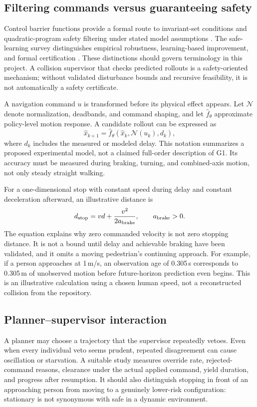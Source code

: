 \documentclass[11pt,a4paper]{article}
\begin{document}
\subsection{Filtering commands versus guaranteeing safety}
Control barrier functions provide a formal route to invariant-set conditions
and quadratic-program safety filtering under stated model assumptions
\citep{cbf}. The safe-learning survey distinguishes empirical robustness,
learning-based improvement, and formal certification \citep{safecontrol}.
These distinctions should govern terminology in this project. A collision
supervisor that checks predicted rollouts is a safety-oriented mechanism;
without validated disturbance bounds and recursive feasibility, it is not
automatically a safety certificate.

A navigation command $u$ is transformed before its physical effect appears.
Let $\mathcal{N}$ denote normalization, deadbands, and command shaping, and
let $\hat f_\theta$ approximate policy-level motion response. A candidate
rollout can be expressed as
\begin{equation}
\hat x_{k+1}=\hat f_\theta(\hat x_k,\mathcal{N}(u_k),d_k),
\end{equation}
where $d_k$ includes the measured or modeled delay. This notation summarizes
a proposed experimental model, not a claimed full-order description of G1.
Its accuracy must be measured during braking, turning, and combined-axis
motion, not only steady straight walking.

For a one-dimensional stop with constant speed during delay and constant
deceleration afterward, an illustrative distance is
\begin{equation}
d_{\rm stop}=v d+\frac{v^2}{2a_{\rm brake}},\qquad a_{\rm brake}>0.
\label{eq:stop}
\end{equation}
The equation explains why zero commanded velocity is not zero stopping
distance. It is not a bound until delay and achievable braking have been
validated, and it omits a moving pedestrian's continuing approach.
For example, if a person approaches at 1\,m/s, an observation age of
0.305\,s corresponds to 0.305\,m of unobserved motion before future-horizon
prediction even begins. This is an illustrative calculation using a chosen
human speed, not a reconstructed collision from the repository.

\subsection{Planner--supervisor interaction}
A planner may choose a trajectory that the supervisor repeatedly vetoes.
Even when every individual veto seems prudent, repeated disagreement can
cause oscillation or starvation. A suitable study measures override rate,
rejected-command reasons, clearance under the actual applied command,
yield duration, and progress after resumption. It should also distinguish
stopping in front of an approaching person from moving to a genuinely
lower-risk configuration: stationary is not synonymous with safe in a
dynamic environment.
\end{document}
